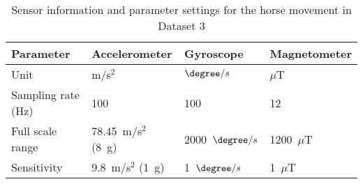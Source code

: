 \begin{table}[!htb]
\centering
	\caption{Sensor information and parameter settings for the horse movement in Dataset 3}
	\label{tab:horse_sensor_settings}
\begin{tabular}{@{}llll@{}}
\toprule
\textbf{Parameter}       & \textbf{Accelerometer} & \textbf{Gyroscope} & \textbf{Magnetometer} \\ \midrule
Unit  & m/s$^2$   & $\degree/s$ & $\mu$T \\
Sampling rate (Hz)       & 100                    & 100                & 12                   \\
Full scale range         & 78.45~m/s$^2$ (8~g)    & 2000~$\degree/s$  &  1200~$\mu$T   \\
Sensitivity   & 9.8~m/s$^2$ (1~g)      & 1~$\degree/s$              & 1~$\mu$T                 \\ \bottomrule
\end{tabular}
\end{table}